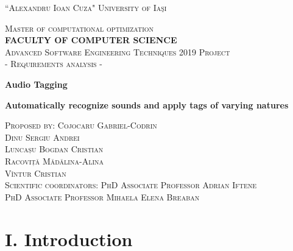\documentclass[11pt, a4papper]{report}
\theoremstyle{plain}
\theoremstyle{definition}
\theoremstyle{definition}
\theoremstyle{proposition}
\begin{document}
\begin{center}

\vspace*{.06\textheight}
{\scshape\large {``Alexandru Ioan Cuza" University of Iaşi}\par}\vspace{0.3cm} 
\textsc{\large {Master of computational optimization}}\\[0.3cm] 
\textbf{\textsc{\large {FACULTY OF COMPUTER SCIENCE }}}\\[1.3cm] 


\vspace{0.4cm}
\textsc{\large {Advanced Software Engineering Techniques 2019 Project}}\\[0.1cm]
\textsc{\large { - Requirements analysis - }}\\[2.7cm]

\vspace{0.6cm}
{\LARGE \bfseries {Audio Tagging}\par}
\vspace{0.2cm} 
{\Large \bfseries {Automatically recognize sounds and apply tags of varying natures}\par}


\vspace{4.4cm}

\begin{center}
\textsc{\large Proposed by: Cojocaru Gabriel-Codrin}\\
\textsc{\large Dinu Sergiu Andrei} \\
\textsc{\large Luncașu Bogdan Cristian} \\
\textsc{\large Racoviță Mădălina-Alina} \\
\textsc{\large Vîntur Cristian} \\
[3.1cm]
\textsc{\large Scientific coordinators}: {\textsc{\large PhD Associate Professor Adrian Iftene}} \\
{\textsc{\large PhD Associate Professor Mihaela Elena Breaban}}
\end{center}
\end{center}
\newpage

\tableofcontents
\newpage

\chapter*{I. Introduction}

\end{document}
